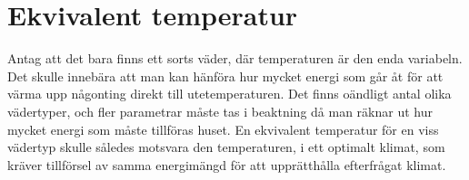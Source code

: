 \section{Ekvivalent temperatur}
Antag att det bara finns ett sorts väder, där temperaturen är den enda variabeln. Det skulle innebära att man kan hänföra hur mycket energi som går åt för att värma upp någonting direkt till utetemperaturen. Det finns oändligt antal olika vädertyper, och fler parametrar måste tas i beaktning då man räknar ut hur mycket energi som måste tillföras huset. En ekvivalent temperatur för en viss vädertyp skulle således motsvara den temperaturen, i ett optimalt klimat, som kräver tillförsel av samma energimängd för att upprätthålla efterfrågat klimat.
